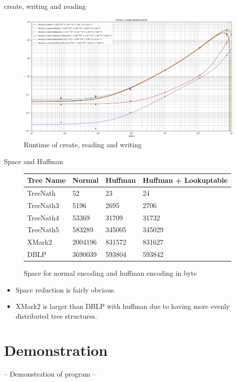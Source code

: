 \documentclass{beamer}
\begin{document}
\begin{frame}{create, writing and reading}
	\begin{figure}[H]
	\includegraphics[scale=0.25]{file_compare_cut}
	\caption{Runtime of create, reading and writing}
	\label{complexQue:image1}
	\end{figure}
\end{frame}

\begin{frame}{Space and Huffman}
	\begin{figure}[h]
	\begin{tabular}{ |p{2cm}||p{1.7cm}|p{1.7cm}|p{4cm}|  }
		 \hline
		 Tree Name & Normal &Huffman &Huffman + Lookuptable\\
		 \hline
		 TreeNath   & 52    & 23 &   24 \\
		 TreeNath3&5196 &2695&  2706\\
		 TreeNath4&53369& 31709&  31732\\
		 TreeNath5&583289&345005&345029\\
		 XMark2&2004196&831572&831627\\
		 DBLP&3690039&593804&593842\\
		 \hline
	\end{tabular}
	\caption{Space for normal encoding and huffman encoding in byte}
	\label{huff:table1}
	\end{figure}
	\begin{itemize}
	\item
		Space reduction is fairly obvious.
	\item
		XMark2 is larger than DBLP with huffman due to having more evenly distributed tree structures.
	\end{itemize}
\end{frame}

\section{Demonstration}
\begin{frame}
	-- Demonstration of program --
\end{frame}
\end{document}

